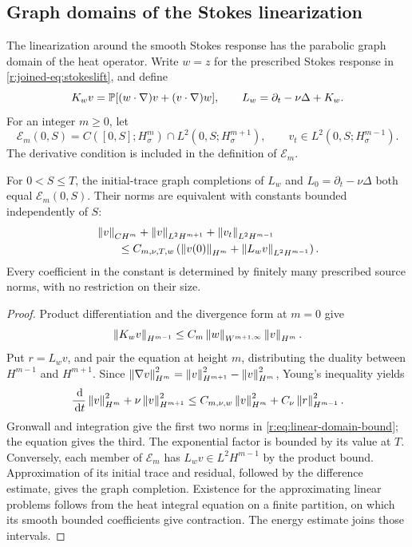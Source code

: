 
\subsection{Graph domains of the Stokes linearization}
\label{r:sec:linear-domains}

The linearization around the smooth Stokes response has the
parabolic graph domain of the heat operator.
Write \(w=z\) for the prescribed Stokes response in
\eqref{r:joined-eq:stokeslift}, and define
\[
 K_wv=\mathbb P[(w\cdot\nabla)v+(v\cdot\nabla)w],
 \qquad L_w=\partial_t-\nu\Delta+K_w.
\]
For an integer \(m\ge0\), let
\[
 \mathcal E_m(0,S)=
 C([0,S];H^m_\sigma)\cap L^2(0,S;H^{m+1}_\sigma),
 \qquad v_t\in L^2(0,S;H^{m-1}_\sigma).
\]
The derivative condition is included in the definition of \(\mathcal E_m\).

\begin{proposition}
For \(0<S\le T\), the initial-trace graph completions of \(L_w\) and
\(L_0=\partial_t-\nu\Delta\) both equal \(\mathcal E_m(0,S)\).
Their norms are equivalent with constants bounded independently of \(S\):
\begin{equation}
 \begin{aligned}
 &\left\lVert v\right\rVert_{CH^m}+\left\lVert v\right\rVert_{L^2H^{m+1}}
       +\left\lVert v_t\right\rVert_{L^2H^{m-1}}\\
 &\qquad\le C_{m,\nu,T,w}
 \left(\left\lVert v(0)\right\rVert_{H^m}+\left\lVert L_wv\right\rVert_{L^2H^{m-1}}\right).
 \end{aligned}
 \label{r:eq:linear-domain-bound}
\end{equation}
Every coefficient in the constant is determined by finitely many prescribed
source norms, with no restriction on their size.
\end{proposition}

\begin{proof}
Product differentiation and the divergence form at \(m=0\) give
\[
 \left\lVert K_wv\right\rVert_{H^{m-1}}
 \le C_m\left\lVert w\right\rVert_{W^{m+1,\infty}}\left\lVert v\right\rVert_{H^m}.
\]
Put \(r=L_wv\), and pair the equation at height \(m\), distributing
the duality between \(H^{m-1}\) and \(H^{m+1}\).
Since
\(\left\lVert \nabla v\right\rVert_{H^m}^2=\left\lVert v\right\rVert_{H^{m+1}}^2-\left\lVert v\right\rVert_{H^m}^2\),
Young's inequality yields
\[
 \frac{\,\mathrm d}{\,\mathrm d t}\left\lVert v\right\rVert_{H^m}^2+\nu\left\lVert v\right\rVert_{H^{m+1}}^2
 \le C_{m,\nu,w}\left\lVert v\right\rVert_{H^m}^2+C_\nu\left\lVert r\right\rVert_{H^{m-1}}^2.
\]
Gronwall and integration give the first two norms in
\eqref{r:eq:linear-domain-bound}; the equation gives the third.
The exponential factor is bounded by its value at \(T\).
Conversely, each member of \(\mathcal E_m\) has \(L_wv\in L^2H^{m-1}\)
by the product bound. Approximation of its initial trace and residual,
followed by the difference estimate, gives the graph completion.
Existence for the approximating linear problems follows from the heat
integral equation on a finite partition, on which its smooth bounded
coefficients give contraction. The energy estimate joins those intervals.
\end{proof}

